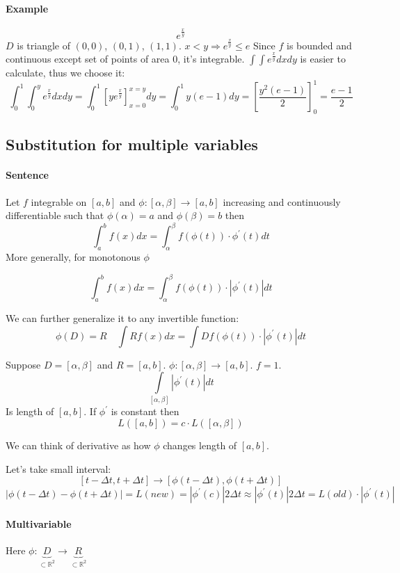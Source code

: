 \paragraph{Example}
$$e^{\frac{x}{y}}$$
$D$ is triangle of $(0,0)$, $(0,1)$, $(1,1)$.
$x<y \Rightarrow e^{\frac{x}{y}}\leq e$ 
Since $f$ is bounded and continuous except set of points of area 0, it's integrable.
$\int \int e^{\frac{x}{y}} dx dy$ is easier to calculate, thus we choose it:
$$\int_0^1 \int_0^y e^{\frac{x}{y}} dx dy = \int_0^1 \left[ye^{\frac{x}{y}}\right]_{x=0}^{x=y}dy = \int_0^1 y(e -1) dy =\left[ \frac{y^2(e-1)}{2}\right]_0^1 = \frac{e-1}{2}$$
\subsection{Substitution for multiple variables}
\paragraph{Sentence}
Let $f$ integrable on $[a,b]$ and $\phi: [\alpha, \beta] \to [a,b]$ increasing and continuously differentiable such that $\phi(\alpha) = a$ and $\phi(\beta) = b$ then
$$\int_a^b f(x) dx = \int_{\alpha}^{\beta} f(\phi(t))\cdot \phi^\prime (t) dt$$
More generally, for monotonous $\phi$

$$\int_a^b f(x) dx = \int_{\alpha}^{\beta} f(\phi(t))\cdot \left|\phi^\prime (t)\right| dt$$

We can further generalize it to any invertible function:
$$\phi(D) = R \quad \int\limits{R} f(x) dx = \int\limits{D} f(\phi(t))\cdot \left|\phi^\prime (t)\right| dt$$

Suppose $D=[\alpha, \beta]$ and $R=[a,b]$. $\phi: [\alpha, \beta] \to [a,b]$. $f=1$. 
$$\int\limits_{[\alpha, \beta]}|\phi^\prime(t)|dt$$
Is length of $[a,b]$. 
If $\phi^\prime$ is constant then
$$L([a,b]) = c \cdot L([\alpha, \beta])$$

We can think of derivative as how $\phi$ changes length of $[a,b]$.

Let's take small interval:$$[t-\Delta t, t+\Delta t] \to [\phi(t-\Delta t), \phi(t+\Delta t)]$$
$$\left|\phi(t-\Delta t) -  \phi(t+\Delta t)\right| = L(new) = |\phi^\prime(c)|2\Delta t \approx |\phi^\prime(t)|2\Delta t = L(old) \cdot |\phi^\prime(t)|$$

\paragraph{Multivariable}
Here $\phi: \underbrace{D}_{\subset \mathbb{R}^2} \to \underbrace{R}_{\subset \mathbb{R}^2}$


